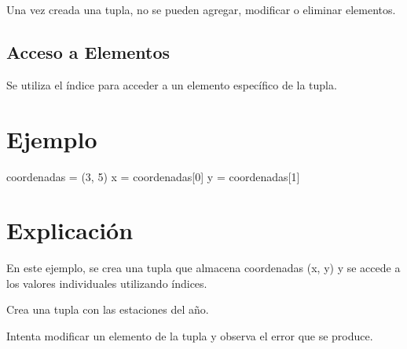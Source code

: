 \documentclass[
  a4paper,
  onepage,
  openany]{scrreprt}
\newenvironment{Shaded}{\begin{snugshade}}{\end{snugshade}}
\newcommand{\DecValTok}[1]{\textcolor[rgb]{0.68,0.00,0.00}{#1}}
\newcommand{\NormalTok}[1]{\textcolor[rgb]{0.00,0.23,0.31}{#1}}
\newcommand{\OperatorTok}[1]{\textcolor[rgb]{0.37,0.37,0.37}{#1}}
\begin{document}
Una vez creada una tupla, no se pueden agregar, modificar o eliminar
elementos.

\hypertarget{acceso-a-elementos-3}{%
\subsection{Acceso a Elementos}\label{acceso-a-elementos-3}}

Se utiliza el índice para acceder a un elemento específico de la tupla.

\hypertarget{ejemplo-21}{%
\section{Ejemplo}\label{ejemplo-21}}

\begin{Shaded}
\begin{Highlighting}[]
\NormalTok{coordenadas }\OperatorTok{=}\NormalTok{ (}\DecValTok{3}\NormalTok{, }\DecValTok{5}\NormalTok{)}
\NormalTok{x }\OperatorTok{=}\NormalTok{ coordenadas[}\DecValTok{0}\NormalTok{]}
\NormalTok{y }\OperatorTok{=}\NormalTok{ coordenadas[}\DecValTok{1}\NormalTok{]}
\end{Highlighting}
\end{Shaded}

\hypertarget{explicaciuxf3n-21}{%
\section{Explicación}\label{explicaciuxf3n-21}}

En este ejemplo, se crea una tupla que almacena coordenadas (x, y) y se
accede a los valores individuales utilizando índices.

\begin{tcolorbox}[enhanced jigsaw, breakable, opacityback=0, toptitle=1mm, coltitle=black, toprule=.15mm, rightrule=.15mm, colframe=quarto-callout-important-color-frame, opacitybacktitle=0.6, arc=.35mm, title=\textcolor{quarto-callout-important-color}{\faExclamation}\hspace{0.5em}{Actividad Práctica:}, titlerule=0mm, colbacktitle=quarto-callout-important-color!10!white, bottomtitle=1mm, bottomrule=.15mm, colback=white, left=2mm, leftrule=.75mm]

Crea una tupla con las estaciones del año.

Intenta modificar un elemento de la tupla y observa el error que se
produce.

\end{tcolorbox}
\end{document}
